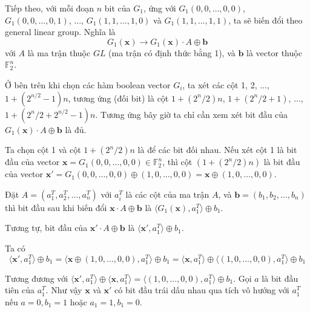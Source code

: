 \documentclass{article}
\newcommand{\FF}{\mathbb{F}}
\begin{document}
Tiếp theo, với mỗi đoạn $n$ bit của $G_1$, ứng với $G_1(0, 0, \ldots, 0, 0)$, $G_1(0, 0, \ldots, 0, 1)$, ..., $G_1(1, 1, \ldots, 1, 0)$ và $G_1(1, 1, \ldots, 1, 1)$, ta sẽ biến đổi theo general linear group. Nghĩa là \[ G_1(\bm{x}) \to G_1(\bm{x}) \cdot A \oplus \bm{b} \] với $A$ là ma trận thuộc $GL$ (ma trận có định thức bằng 1), và $\bm{b}$ là vector thuộc $\FF_2^n$.

Ở bên trên khi chọn các hàm boolean vector $G_i$, ta xét các cột 1, 2, ..., $1 + (2^{n/2}-1)n$, tương ứng (đối bit) là cột $1 + (2^n/2)n$, $1 + (2^n/2+1)$, ..., $1 + (2^n/2+2^{n/2}-1)n$. Tương ứng bây giờ ta chỉ cần xem xét bit đầu của $G_1(\bm{x}) \cdot A \oplus \bm{b}$ là đủ.

Ta chọn cột 1 và cột $1 + (2^n/2)n$ là để các bit đối nhau. Nếu xét cột 1 là bit đầu của vector $\bm{x} = G_1 (0, 0, \ldots, 0, 0) \in \FF_2^n$, thì cột $(1 + (2^n/2)n)$ là bit đầu của vector $\bm{x}' = G_1 (0, 0, \ldots, 0, 0) \oplus (1, 0, \ldots, 0, 0) = \bm{x} \oplus (1, 0, \ldots, 0, 0)$.

Đặt $A = (a_1^T, a_2^T, \ldots, a_n^T)$ với $a_i^T$ là các cột của ma trận $A$, và $\bm{b} = (b_1, b_2, \ldots, b_n)$ thì bit đầu sau khi biến đổi $\bm{x} \cdot A \oplus \bm{b}$ là $\langle G_1 (\bm{x}), a_1^T \rangle \oplus b_1$.

Tương tự, bit đầu của $\bm{x}' \cdot A \oplus \bm{b}$ là $\langle \bm{x}', a_1^T \rangle \oplus b_1$.

Ta có \[ \langle \bm{x}', a_1^T \rangle \oplus b_1 = \langle \bm{x} \oplus (1, 0, \ldots, 0, 0), a_1^T \rangle \oplus b_1 = \langle \bm{x}, a_1^T \rangle \oplus \langle (1, 0, \ldots, 0, 0), a_1^T \rangle \oplus b_1 \]

Tương đương với $\langle \bm{x}', a_1^T \rangle \oplus \langle \bm{x}, a_1^T \rangle = \langle (1, 0, \ldots, 0, 0), a_1^T \rangle \oplus b_1$. Gọi $a$ là bit đầu tiên của $a_1^T$. Như vậy $\bm{x}$ và $\bm{x}'$ có bit đầu trái dấu nhau qua tích vô hướng với $a_1^T$ nếu $a = 0, b_1 = 1$ hoặc $a_1 = 1, b_1 = 0$.
\end{document}
